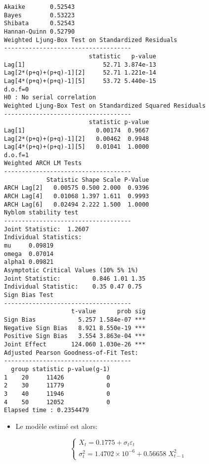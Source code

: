 \documentclass[
  ignorenonframetext,
]{beamer}
\providecommand{\tightlist}{%
  \setlength{\itemsep}{0pt}\setlength{\parskip}{0pt}}
\providecommand{\tightlist}{%
  \setlength{\itemsep}{0pt}\setlength{\parskip}{0pt}}
\begin{document}
\begin{frame}[fragile]
\begin{verbatim}
Akaike       0.52543
Bayes        0.53223
Shibata      0.52543
Hannan-Quinn 0.52790
Weighted Ljung-Box Test on Standardized Residuals
------------------------------------
                        statistic   p-value
Lag[1]                      52.71 3.874e-13
Lag[2*(p+q)+(p+q)-1][2]     52.71 1.221e-14
Lag[4*(p+q)+(p+q)-1][5]     53.72 5.440e-15
d.o.f=0
H0 : No serial correlation
Weighted Ljung-Box Test on Standardized Squared Residuals
------------------------------------
                        statistic p-value
Lag[1]                    0.00174  0.9667
Lag[2*(p+q)+(p+q)-1][2]   0.00462  0.9948
Lag[4*(p+q)+(p+q)-1][5]   0.01041  1.0000
d.o.f=1
Weighted ARCH LM Tests
------------------------------------
            Statistic Shape Scale P-Value
ARCH Lag[2]   0.00575 0.500 2.000  0.9396
ARCH Lag[4]   0.01068 1.397 1.611  0.9993
ARCH Lag[6]   0.02494 2.222 1.500  1.0000
Nyblom stability test
------------------------------------
Joint Statistic:  1.2607
Individual Statistics:              
mu     0.09819
omega  0.07014
alpha1 0.09821
Asymptotic Critical Values (10% 5% 1%)
Joint Statistic:         0.846 1.01 1.35
Individual Statistic:    0.35 0.47 0.75
Sign Bias Test
------------------------------------
                   t-value      prob sig
Sign Bias            5.257 1.584e-07 ***
Negative Sign Bias   8.921 8.550e-19 ***
Positive Sign Bias   3.554 3.863e-04 ***
Joint Effect       124.060 1.030e-26 ***
Adjusted Pearson Goodness-of-Fit Test:
------------------------------------
  group statistic p-value(g-1)
1    20     11426            0
2    30     11779            0
3    40     11946            0
4    50     12052            0
Elapsed time : 0.2354479 
\end{verbatim}
\end{frame}
\begin{frame}
\begin{itemize}[<+->]
\tightlist
\item
  Le modèle estimé est alors:
\end{itemize}
\[
\begin{cases}
X_t=0.1775+\sigma_t \varepsilon_t\\
\sigma^2_t=1.4702 \times 10^{-6}+0.56658\; X^2_{t-1}
\end{cases}
\]
\end{frame}
\end{document}
